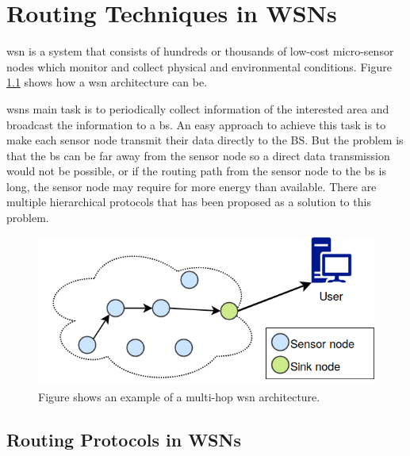 \documentclass[USenglish]{uit-thesis}
\newcommand{\definition}[1]{%
  \refstepcounter{definition}%
  \par\noindent\textbf{The Definition~\thedefinition. #1}%
  \addcontentsline{def}{definition}
    {\protect\numberline{\thechapter.\thedefinition}#1}\par%
}
\begin{document}



\chapter{Routing Techniques in WSNs}

\gls{wsn} is a system that consists of hundreds or thousands of low-cost micro-sensor nodes which monitor and collect physical and environmental conditions. Figure \ref{fig:wsn} shows how a \gls{wsn} architecture can be. 

\gls{wsn}s  main task is to periodically collect information of the interested area and broadcast the information to a \gls{bs}. An easy approach to achieve this task is to make each sensor node transmit their data directly to the BS. But the problem is that the \gls{bs} can be far away from the sensor node so a direct data transmission would not be possible, or if the routing path from the sensor node to the \gls{bs} is long, the sensor node may require for more energy than available. There are multiple hierarchical protocols that has been proposed as a solution to this problem.

\begin{figure}
\centering
\includegraphics[width=\textwidth]{wsn.png}
\caption{Figure shows an example of a multi-hop \gls{wsn} architecture.}
\label{fig:wsn}
\end{figure}


\section{Routing Protocols in WSNs}
\end{document}

